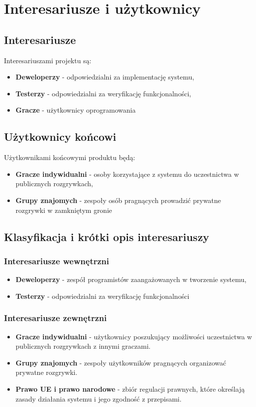 \documentclass[12pt,a4paper,colorlinks=true,linkcolor=NavyBlue,citecolor=red,urlcolor=NavyBlue]{book}
\begin{document}
\clearpage

\chapter{Interesariusze i użytkownicy}

\section{Interesariusze}
Interesariuszami projektu są:
\begin{itemize}
    \item \textbf{Deweloperzy} - odpowiedzialni za implementację systemu,
    \item \textbf{Testerzy} - odpowiedzialni za weryfikację funkcjonalności,
    \item \textbf{Gracze} - użytkownicy oprogramowania
\end{itemize}

\section{Użytkownicy końcowi}
Użytkownikami końcowymi produktu będą:
\begin{itemize}
    \item \textbf{Gracze indywidualni} - osoby korzystające z systemu do uczestnictwa w publicznych rozgrywkach,
    \item \textbf{Grupy znajomych} - zespoły osób pragnących prowadzić prywatne rozgrywki w zamkniętym gronie
\end{itemize}

\section{Klasyfikacja i krótki opis interesariuszy}
\subsection{Interesariusze wewnętrzni}
\begin{itemize}
    \item \textbf{Deweloperzy} - zespół programistów zaangażowanych w tworzenie systemu,
    \item \textbf{Testerzy} - odpowiedzialni za weryfikację funkcjonalności
\end{itemize}

\subsection{Interesariusze zewnętrzni}
\begin{itemize}
    \item \textbf{Gracze indywidualni} - użytkownicy poszukujący możliwości uczestnictwa w publicznych rozgrywkach z innymi graczami.
    \item \textbf{Grupy znajomych} - zespoły użytkowników pragnących organizować prywatne rozgrywki.
    \item \textbf{Prawo UE i prawo narodowe} - zbiór regulacji prawnych, które określają zasady działania systemu i jego zgodność z przepisami.
\end{itemize}
\end{document}

